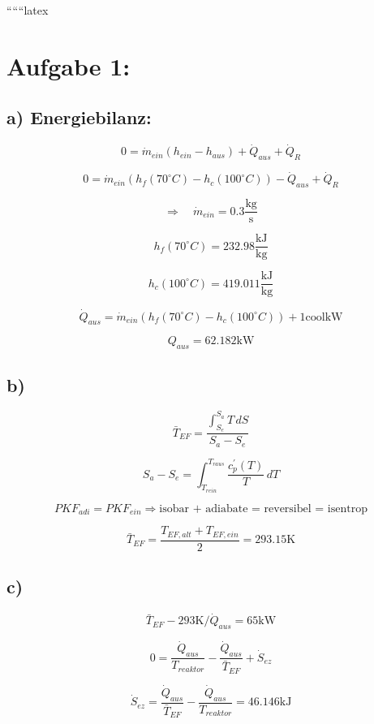 
``````latex


\section*{Aufgabe 1:}

\subsection*{a) Energiebilanz:}

\[
0 = \dot{m}_{ein} (h_{ein} - h_{aus}) + \dot{Q}_{aus} + \dot{Q}_R
\]

\[
0 = \dot{m}_{ein} \left( h_f(70^\circ C) - h_c(100^\circ C) \right) - \dot{Q}_{aus} + \dot{Q}_R
\]

\[
\Rightarrow \quad \dot{m}_{ein} = 0.3 \frac{\text{kg}}{\text{s}}
\]

\[
h_f(70^\circ C) = 232.98 \frac{\text{kJ}}{\text{kg}}
\]

\[
h_c(100^\circ C) = 419.011 \frac{\text{kJ}}{\text{kg}}
\]

\[
\dot{Q}_{aus} = \dot{m}_{ein} \left( h_f(70^\circ C) - h_c(100^\circ C) \right) + 1 \text{cool} \text{kW}
\]

\[
Q_{aus} = 62.182 \text{kW}
\]

\subsection*{b)}

\[
\bar{T}_{EF} = \frac{\int_{S_e}^{S_a} T \, dS}{S_a - S_e}
\]


\[
S_a - S_e = \int_{T_{rein}}^{T_{raus}} \frac{c_p^\prime (T)}{T} \, dT
\]

\[
PKF_{adi} = PKF_{ein} \Rightarrow \text{isobar + adiabate = reversibel = isentrop}
\]

\[
\bar{T}_{EF} = \frac{T_{EF,alt} + T_{EF,ein}}{2} = 293.15 \text{K}
\]

\subsection*{c)}

\[
\bar{T}_{EF} - 293 \text{K} / \dot{Q}_{aus} = 65 \text{kW}
\]

\[
0 = \frac{\dot{Q}_{aus}}{T_{reaktor}} - \frac{\dot{Q}_{aus}}{\bar{T}_{EF}} + \dot{S}_{ez}
\]

\[
\dot{S}_{ez} = \frac{\dot{Q}_{aus}}{\bar{T}_{EF}} - \frac{\dot{Q}_{aus}}{T_{reaktor}} = 46.146 \text{kJ}
\]

